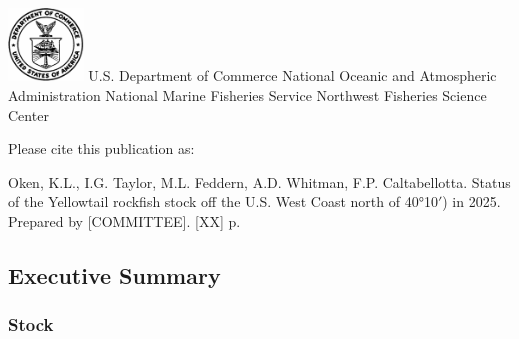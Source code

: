 \documentclass[
]{scrartcl}
\renewcommand*\contentsname{Table of contents}
\newcommand\contentsname{Table of contents}
\begin{document}
\begin{titlepage}
\begin{minipage}[b][\textheight][s]{\textwidth}
  \vspace{1\baselineskip}



  \vfill


  \vspace{1\baselineskip}

  \includegraphics[alt={},width=2cm]{support_files/us_doc_logo.png}\newline %
  U.S. Department of Commerce\newline
  National Oceanic and Atmospheric Administration\newline
  National Marine Fisheries Service\newline
  Northwest Fisheries Science Center\newline

  \end{minipage}
  \restoregeometry
  \end{titlepage}

\renewcommand*\contentsname{Table of contents}
{
\hypersetup{linkcolor=}
\setcounter{tocdepth}{3}
\tableofcontents
}
\listoffigures
\listoftables

\newpage{}

Please cite this publication as:

Oken, K.L., I.G. Taylor, M.L. Feddern, A.D. Whitman, F.P. Caltabellotta.
Status of the Yellowtail rockfish stock off the U.S. West Coast north of
40°10\(\prime\)) in 2025. Prepared by {[}COMMITTEE{]}. {[}XX{]} p.

\newpage{}

\subsection{Executive Summary}\label{executive-summary}

\subsubsection{Stock}\label{stock}
\end{document}
